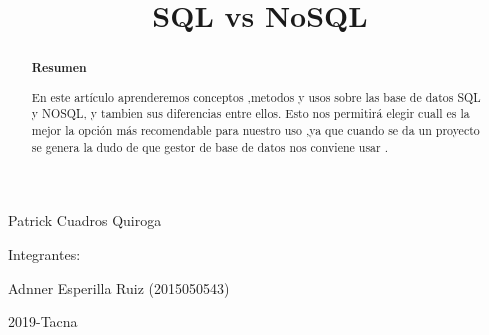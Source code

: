 \documentclass[%
 reprint,
 amsmath,amssymb,
 aps,
]{revtex4-1}
\begin{document}
\begin{titlepage}
\begin{center}
\vspace*{0.1in}
\begin{large}
 Patrick Cuadros Quiroga\\
\end{large}

\vspace*{0.2in}
\vspace*{0.1in}
\begin{large}
Integrantes: \\
\begin{flushleft}
Adnner Esperilla Ruiz		\hfill	(2015050543) \\

\vspace*{0.5in}
\begin{center}
2019-Tacna\\
\end{center}
\vspace*{2in}
\end{flushleft}
\end{large}
\end{center}

\end{titlepage}



\title{SQL vs NoSQL}


\begin{abstract}
\begin{center}
\vspace*{0.5in}
\textbf{Resumen}
\end{center}

En este artículo aprenderemos conceptos ,metodos y usos sobre las base de datos SQL y NOSQL, y tambien sus diferencias entre ellos. Esto nos permitirá elegir cuall es la mejor la opción más recomendable para nuestro uso ,ya que cuando se da un proyecto se genera la dudo de que gestor de base de datos nos conviene usar .\\


\begin{center}

\end{center}


\end{abstract}


\maketitle

\end{document}
